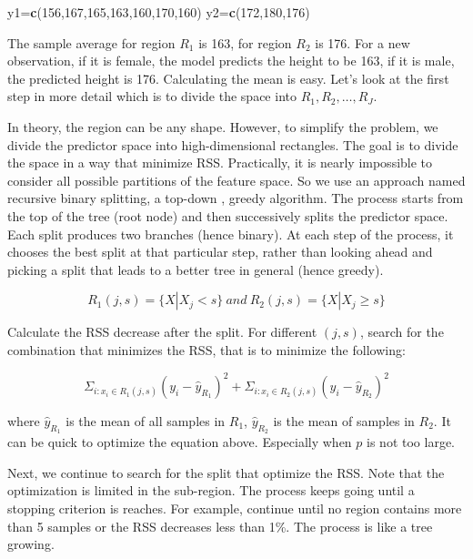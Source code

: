 \documentclass[12pt,]{krantz}
\makeatletter
\newenvironment{Shaded}{\begin{snugshade}}{\end{snugshade}}
\newcommand{\DecValTok}[1]{\textcolor[rgb]{0.06,0.06,0.06}{#1}}
\newcommand{\KeywordTok}[1]{\textcolor[rgb]{0.27,0.27,0.27}{\textbf{#1}}}
\newcommand{\NormalTok}[1]{#1}
\newenvironment{kframe}{%
\medskip{}
\setlength{\fboxsep}{.8em}
 \def\at@end@of@kframe{}%
 \ifinner\ifhmode%
  \def\at@end@of@kframe{\end{minipage}}%
  \begin{minipage}{\columnwidth}%
 \fi\fi%
 \def\FrameCommand##1{\hskip\@totalleftmargin \hskip-\fboxsep
 \colorbox{shadecolor}{##1}\hskip-\fboxsep
     \hskip-\linewidth \hskip-\@totalleftmargin \hskip\columnwidth}%
 \MakeFramed {\advance\hsize-\width
   \@totalleftmargin\z@ \linewidth\hsize
   \@setminipage}}%
 {\par\unskip\endMakeFramed%
 \at@end@of@kframe}
\renewenvironment{Shaded}{\begin{kframe}}{\end{kframe}}
\makeatother
\begin{document}
\begin{Shaded}
\begin{Highlighting}[]
\NormalTok{y1=}\KeywordTok{c}\NormalTok{(}\DecValTok{156}\NormalTok{,}\DecValTok{167}\NormalTok{,}\DecValTok{165}\NormalTok{,}\DecValTok{163}\NormalTok{,}\DecValTok{160}\NormalTok{,}\DecValTok{170}\NormalTok{,}\DecValTok{160}\NormalTok{)}
\NormalTok{y2=}\KeywordTok{c}\NormalTok{(}\DecValTok{172}\NormalTok{,}\DecValTok{180}\NormalTok{,}\DecValTok{176}\NormalTok{)}
\end{Highlighting}
\end{Shaded}

The sample average for region \(R_1\) is 163, for region \(R_2\) is 176. For a new observation, if it is female, the model predicts the height to be 163, if it is male, the predicted height is 176. Calculating the mean is easy. Let's look at the first step in more detail which is to divide the space into \(R_1, R_2, \dots, R_J\).

In theory, the region can be any shape. However, to simplify the problem, we divide the predictor space into high-dimensional rectangles. The goal is to divide the space in a way that minimize RSS. Practically, it is nearly impossible to consider all possible partitions of the feature space. So we use an approach named recursive binary splitting, a top-down , greedy algorithm. The process starts from the top of the tree (root node) and then successively splits the predictor space. Each split produces two branches (hence binary). At each step of the process, it chooses the best split at that particular step, rather than looking ahead and picking a split that leads to a better tree in general (hence greedy).

\[R_{1}(j, s)=\{X|X_j<s\}\ and\ R_{2}(j, s)=\{X|X_j\geq s\}\]

Calculate the RSS decrease after the split. For different \((j,s)\), search for the combination that minimizes the RSS, that is to minimize the following:

\[\Sigma_{i:x_i\in R_1(j,s)}(y_i-\hat{y}_{R_{1}})^2+\Sigma_{i:x_i\in R_2(j,s)}(y_i-\hat{y}_{R_{2}})^2\]

where \(\hat{y}_{R_1}\) is the mean of all samples in \(R_1\), \(\hat{y}_{R_2}\) is the mean of samples in \(R_2\). It can be quick to optimize the equation above. Especially when \(p\) is not too large.

Next, we continue to search for the split that optimize the RSS. Note that the optimization is limited in the sub-region. The process keeps going until a stopping criterion is reaches. For example, continue until no region contains more than 5 samples or the RSS decreases less than 1\%. The process is like a tree growing.
\end{document}
